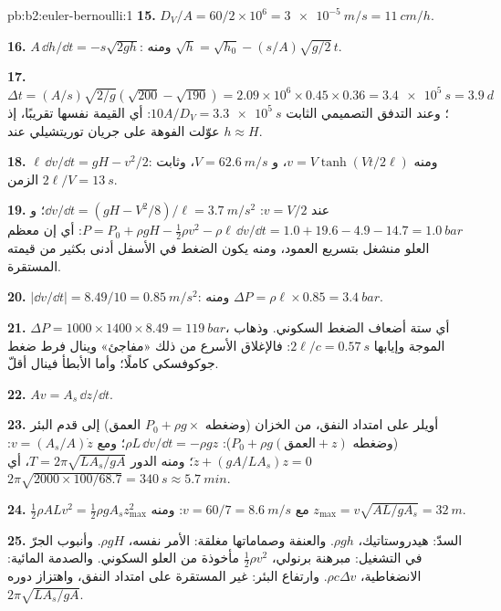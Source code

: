 \begin{solution}{pb:b2:euler-bernoulli:1}
\textbf{15.} $D_V/A = 60/2 \times 10^6 = \qty{3e-5}{m/s} = \qty{11}{cm/h}$.

\textbf{16.} $A\,\dd h/\dd t = -s\sqrt{2gh}$: ومنه $\sqrt h = \sqrt{h_0} - (s/A)\sqrt{g/2}\,t$.

\textbf{17.} $\Delta t = (A/s)\sqrt{2/g}(\sqrt{200} - \sqrt{190}) = 2.09 \times 10^6 \times
0.45 \times 0.36 = \qty{3.4e5}{s} = \qty{3.9}{d}$؛ وعند التدفق التصميمي الثابت
$10A/D_V = \qty{3.3e5}{s}$: أي القيمة نفسها تقريبًا، إذ عوّلت الفوهة
على جريان توريتشيلي عند $h \approx H$.

\textbf{18.} $\ell\,\dd v/\dd t = gH - v^2/2$: ومنه $v = V\tanh(Vt/2\ell)$، و $V = \qty{62.6}{m/s}$،
وثابت الزمن $2\ell/V = \qty{13}{s}$.

\textbf{19.} عند $v = V/2$: $\dd v/\dd t = (gH - V^2/8)/\ell = \qty{3.7}{m/s^2}$؛
و $P = P_0 + \rho gH - \tfrac12\rho v^2 - \rho\ell\,\dd v/\dd t = 1.0 + 19.6 - 4.9 - 14.7
= \qty{1.0}{bar}$: أي إن معظم العلو منشغل بتسريع العمود، ومنه
يكون الضغط في الأسفل أدنى بكثير من قيمته المستقرة.

\textbf{20.} $|\dd v/\dd t| = 8.49/10 = \qty{0.85}{m/s^2}$: ومنه $\Delta P = \rho\ell \times 0.85 =
\qty{3.4}{bar}$.

\textbf{21.} $\Delta P = 1000 \times 1400 \times 8.49 = \qty{119}{bar}$، أي ستة أضعاف
الضغط السكوني. وذهاب الموجة وإيابها $2\ell/c = \qty{0.57}{s}$: فالإغلاق
الأسرع من ذلك «مفاجئ» وينال فرط ضغط جوكوفسكي كاملًا؛
وأما الأبطأ فينال أقلّ.

\textbf{22.} $Av = A_s\,\dd z/\dd t$.

\textbf{23.} أويلر على امتداد النفق، من الخزان (وضغطه
$P_0 + \rho g\times$ العمق) إلى قدم البئر (وضغطه $P_0 + \rho g
(\text{العمق} + z)$): $\rho L\,\dd v/\dd t = -\rho gz$؛ ومع $v = (A_s/A)\dot z$:
$\ddot z + (gA/LA_s)z = 0$؛ ومنه الدور $T = 2\pi\sqrt{LA_s/gA}$، أي $2\pi\sqrt{2000 \times 100/
68.7} = \qty{340}{s} \approx \qty{5.7}{min}$.

\textbf{24.} $\tfrac12\rho ALv^2 = \tfrac12\rho gA_sz_{\max}^2$ مع $v = 60/7 =
\qty{8.6}{m/s}$: ومنه $z_{\max} = v\sqrt{AL/gA_s} = \qty{32}{m}$.

\textbf{25.} السدّ: هيدروستاتيك، $\rho gh$. والعنفة وصماماتها
مغلقة: الأمر نفسه، $\rho gH$. وأنبوب الجرّ في التشغيل: مبرهنة
برنولي، $\tfrac12\rho v^2$ مأخوذة من العلو السكوني. والصدمة
المائية: الانضغاطية، $\rho c\Delta v$. وارتفاع البئر: 
غير المستقرة على امتداد النفق، واهتزاز دوره $2\pi\sqrt{LA_s/gA}$.
\end{solution}
